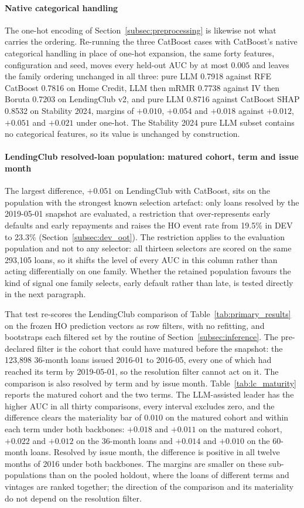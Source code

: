 \documentclass[final,5p,twocolumn]{elsarticle}
\begin{document}
\paragraph{Native categorical handling}
The one-hot encoding of Section~\ref{subsec:preprocessing} is likewise not what carries the ordering. Re-running the three CatBoost cases with CatBoost's native categorical handling in place of one-hot expansion, the same forty features, configuration and seed, moves every held-out AUC by at most $0.005$ and leaves the family ordering unchanged in all three: pure LLM 0.7918 against RFE CatBoost 0.7816 on Home Credit, LLM then mRMR 0.7738 against IV then Boruta 0.7203 on LendingClub v2, and pure LLM 0.8716 against CatBoost SHAP 0.8532 on Stability 2024, margins of $+0.010$, $+0.054$ and $+0.018$ against $+0.012$, $+0.051$ and $+0.021$ under one-hot. The Stability 2024 pure LLM subset contains no categorical features, so its value is unchanged by construction.

\paragraph{LendingClub resolved-loan population: matured cohort, term and issue month}
The largest difference, $+0.051$ on LendingClub with CatBoost, sits on the population with the strongest known selection artefact: only loans resolved by the 2019-05-01 snapshot are evaluated, a restriction that over-represents early defaults and early repayments and raises the HO event rate from 19.5\% in DEV to 23.3\% (Section~\ref{subsec:dev_oot}). The restriction applies to the evaluation population and not to any selector: all thirteen selectors are scored on the same 293,105 loans, so it shifts the level of every AUC in this column rather than acting differentially on one family. Whether the retained population favours the kind of signal one family selects, early default rather than late, is tested directly in the next paragraph.

That test re-scores the LendingClub comparison of Table~\ref{tab:primary_results} on the frozen HO prediction vectors as row filters, with no refitting, and bootstraps each filtered set by the routine of Section~\ref{subsec:inference}. The pre-declared filter is the cohort that could have matured before the snapshot: the 123,898 36-month loans issued 2016-01 to 2016-05, every one of which had reached its term by 2019-05-01, so the resolution filter cannot act on it. The comparison is also resolved by term and by issue month. Table~\ref{tab:lc_maturity} reports the matured cohort and the two terms. The LLM-assisted leader has the higher AUC in all thirty comparisons, every interval excludes zero, and the difference clears the materiality bar of $0.010$ on the matured cohort and within each term under both backbones: $+0.018$ and $+0.011$ on the matured cohort, $+0.022$ and $+0.012$ on the 36-month loans and $+0.014$ and $+0.010$ on the 60-month loans. Resolved by issue month, the difference is positive in all twelve months of 2016 under both backbones. The margins are smaller on these sub-populations than on the pooled holdout, where the loans of different terms and vintages are ranked together; the direction of the comparison and its materiality do not depend on the resolution filter.
\end{document}
